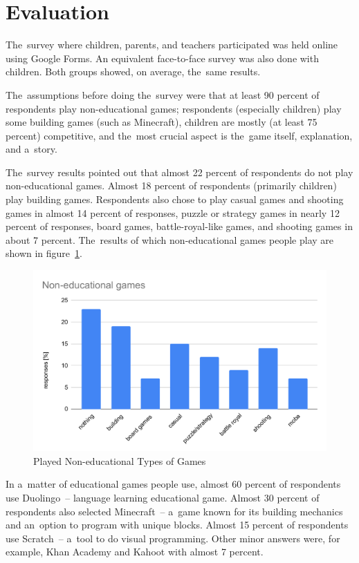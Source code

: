 \section{Evaluation}

The~survey where children, parents, and teachers participated was held online using Google Forms.
An equivalent face-to-face survey was also done with children.
Both groups showed, on average, the~same results.

The~assumptions before doing the~survey were that at least 90 percent of respondents play non-educational games;
respondents (especially children) play some building games (such as Minecraft), children are mostly (at least 75 percent) competitive, and the~most crucial aspect is the~game itself, explanation, and a~story.

The~survey results pointed out that almost 22 percent of respondents do not play non-educational games.
Almost 18 percent of respondents (primarily children) play building games.
Respondents also chose to play casual games and shooting games in almost 14 percent of responses, puzzle or strategy games in nearly 12 percent of responses, board games, battle-royal-like games, and shooting games in about 7 percent.
The~results of which non-educational games people play are shown in figure~\ref{fig:survey:games}.

\begin{figure}
    \centering
    \includegraphics[width=1\linewidth]{assets/survey/non-educational-games.pdf}
    \caption{Played Non-educational Types of Games}
    \label{fig:survey:games}
\end{figure}

In a~matter of educational games people use, almost 60 percent of respondents use Duolingo~-- language learning educational game.
Almost 30 percent of respondents also selected Minecraft~-- a~game known for its building mechanics and an~option to program with unique blocks.
Almost 15 percent of respondents use Scratch~-- a~tool to do visual programming.
Other minor answers were, for example, Khan Academy and Kahoot with almost 7 percent.  


